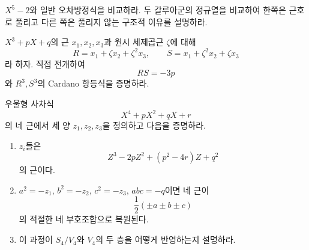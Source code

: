 \begin{exercise}
$X^5-2$와 일반 오차방정식을 비교하라. 두 갈루아군의 정규열을 비교하여 한쪽은 근호로 풀리고 다른 쪽은 풀리지 않는 구조적 이유를 설명하라.
\end{exercise}

\begin{exercise}
$X^3+pX+q$의 근 $x_1,x_2,x_3$과 원시 세제곱근 $\zeta$에 대해
\[
  R=x_1+\zeta x_2+\zeta^2x_3,
  \qquad
  S=x_1+\zeta^2x_2+\zeta x_3
\]
라 하자. 직접 전개하여
\[
  RS=-3p
\]
와 $R^3,S^3$의 Cardano 항등식을 증명하라.
\end{exercise}

\begin{exercise}[*]
우울형 사차식
\[
  X^4+pX^2+qX+r
\]
의 네 근에서 세 양 $z_1,z_2,z_3$을 정의하고 다음을 증명하라.
\begin{enumerate}[label=(\alph*)]
  \item $z_i$들은
  \[
    Z^3-2pZ^2+(p^2-4r)Z+q^2
  \]
  의 근이다.
  \item $a^2=-z_1$, $b^2=-z_2$, $c^2=-z_3$, $abc=-q$이면 네 근이
  \[
    \frac12(\pm a\pm b\pm c)
  \]
  의 적절한 네 부호조합으로 복원된다.
  \item 이 과정이 $S_4/V_4$와 $V_4$의 두 층을 어떻게 반영하는지 설명하라.
\end{enumerate}
\end{exercise}
